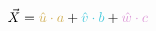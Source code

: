 \documentclass[preview]{standalone}
\begin{document}
$$\vec{X} = \textcolor[HTML]{d2b057}{\hat{u}\cdot a} + \textcolor[HTML]{43c8dc}{\hat{v}\cdot b} + \textcolor[HTML]{dd99d8}{\hat{w}\cdot c}$$
\end{document}

